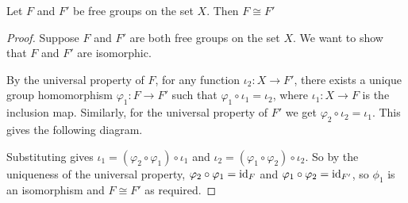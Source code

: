 \begin{theorem}
    Let $F$ and $F'$ be free groups on the set $X$. Then $F \cong F'$
\end{theorem}

\begin{proof}
    Suppose \( F\) and \( F' \) are both free groups on the set \( X \). We want to show that \( F \) and \( F' \) are isomorphic.

By the universal property of $F$, for any function $\iota_2: X \to F'$, there exists a unique group homomorphism $\varphi_1: F \to F'$ such that $\varphi_1 \circ \iota_1 = \iota_2$, where $\iota_1: X \to F$ is the inclusion map. Similarly, for the universal property of $F'$ we get $\varphi_2 \circ \iota_2 = \iota_1$. This gives the following diagram.

\begin{center}
\end{center}

Substituting gives $\iota_1 = (\varphi_2 \circ \varphi_1) \circ \iota_1$ and $\iota_2 = (\varphi_1 \circ \varphi_2) \circ \iota_2$. So by the uniqueness of the universal property, $\varphi_2 \circ \varphi_1 = \mathrm{id}_{F}$ and $\varphi_1 \circ \varphi_2 = \mathrm{id}_{F'}$, so $\phi_1$ is an isomorphism and $F \cong F'$ as required. 
\end{proof}



